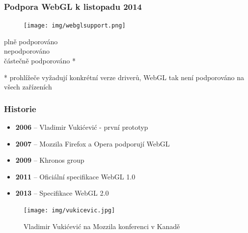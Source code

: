 \documentclass{beamer}
\begin{document}
	

	\begin{frame}[t,fragile]
		\frametitle{Podpora WebGL k listopadu 2014}
		
		\linebreak
		
		\centering
		\begin{figure}		
		\texttt{[image: img/webglsupport.png]}
		\end{figure}
		\textcolor{ggreen}{plně podporováno} \\
		\textcolor{gred}{nepodporováno} \\
		\textcolor{glime}{částečně podporováno} *
		
	
		\flushleft
* \footnotesize{prohlížeče vyžadují konkrétní verze driverů, WebGL tak není podporováno na všech zařízeních}
			

	\end{frame}
	

	\begin{frame}[t,fragile]
		\frametitle{Historie}					
		\begin{itemize}
	    	\item \textbf{2006} – Vladimir Vukićević - první prototyp
			\item \textbf{2007} – Mozzila Firefox a Opera podporují WebGL
			\item \textbf{2009} – Khronos group 
			\item \textbf{2011} – Oficiální specifikace WebGL 1.0
			\item \textbf{2013} – Specifikace WebGL 2.0
		\end{itemize}	
		
		\begin{figure}		
			\texttt{[image: img/vukicevic.jpg]}
			\caption{Vladimir Vukićević na Mozzila konferenci v Kanadě}
		\end{figure}
		
	\end{frame}
	
	
\end{document}
